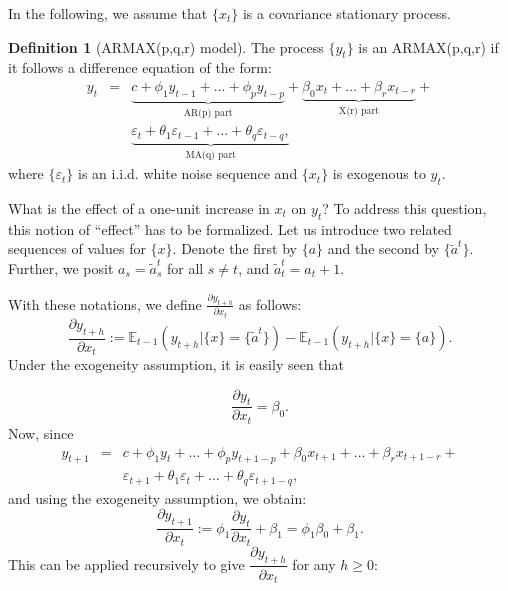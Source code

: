 \documentclass[
  12pt,
]{book}
\theoremstyle{definition}
\newtheorem{definition}{Definition}[chapter]
\theoremstyle{definition}
\theoremstyle{definition}
\theoremstyle{definition}
\theoremstyle{remark}
\begin{document}
In the following, we assume that \(\{x_t\}\) is a covariance stationary process.

\begin{definition}[ARMAX(p,q,r) model]
\protect\hypertarget{def:ARMAX}{}\label{def:ARMAX}The process \(\{y_t\}\) is an ARMAX(p,q,r) if it follows a difference equation of the form:
\begin{eqnarray}
y_t &=& \underbrace{c + \phi_1 y_{t-1} + \dots + \phi_p y_{t-p}}_{\mbox{AR(p) part}} + \underbrace{\beta_0 x_t + \dots + \beta_{r} x_{t-r}}_{\mbox{X(r) part}} + \nonumber \\
&&\underbrace{\varepsilon_t + \theta_1\varepsilon_{t-1}+\dots +\theta_{q}\varepsilon_{t-q},}_{\mbox{MA(q) part}} \label{eq:DLM}
\end{eqnarray}
where \(\{\varepsilon_t\}\) is an i.i.d. white noise sequence and \(\{x_t\}\) is exogenous to \(y_t\).
\end{definition}

What is the effect of a one-unit increase in \(x_t\) on \(y_t\)? To address this question, this notion of ``effect'' has to be formalized. Let us introduce two related sequences of values for \(\{x\}\). Denote the first by \(\{a\}\) and the second by \(\{\tilde{a}^t\}\). Further, we posit \(a_s = \tilde{a}_s^t\) for all \(s \ne t\), and \(\tilde{a}_t^t = a_t+1\).

With these notations, we define \(\frac{\partial y_{t+h}}{\partial x_t}\) as follows:
\begin{equation}
\frac{\partial y_{t+h}}{\partial x_t} := \mathbb{E}_{t-1}(y_{t+h}|\{x\} = \{\tilde{a}^t\}) - \mathbb{E}_{t-1}(y_{t+h}|\{x\} = \{a\}).\label{eq:dynmultX}
\end{equation}
Under the exogeneity assumption, it is easily seen that

\[
\frac{\partial y_t}{\partial x_t} = \beta_0.
\]
Now, since
\begin{eqnarray*}
y_{t+1} &=& c + \phi_1 y_{t} + \dots + \phi_p y_{t+1-p} + \beta_0 x_{t+1} + \dots + \beta_{r} x_{t+1-r} +\\
&&\varepsilon_{t+1} + \theta_1\varepsilon_{t}+\dots +\theta_{q}\varepsilon_{t+1-q},
\end{eqnarray*}
and using the exogeneity assumption, we obtain:
\[
\frac{\partial y_{t+1}}{\partial x_t} := \phi_1 \frac{\partial y_{t}}{\partial x_t} + \beta_1 = \phi_1\beta_0 + \beta_1.
\]
This can be applied recursively to give \(\dfrac{\partial y_{t+h}}{\partial x_t}\) for any \(h \ge 0\):
\end{document}
